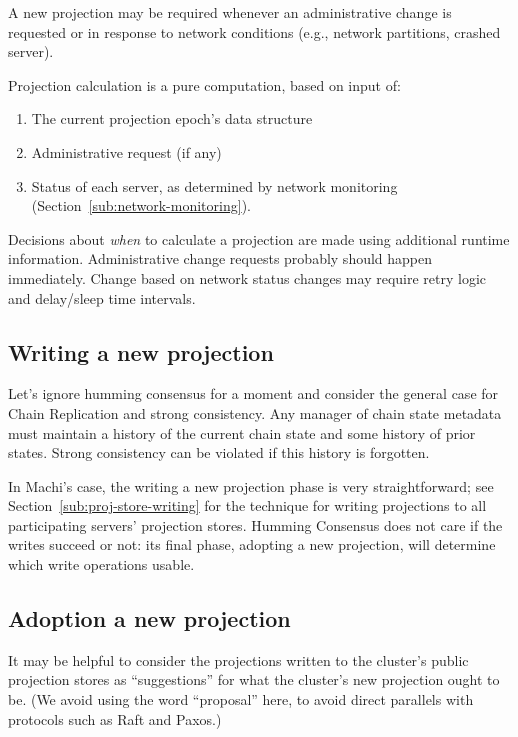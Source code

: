 \documentclass[preprint,10pt]{sigplanconf}
\begin{document}
A new projection may be
required whenever an administrative change is requested or in response
to network conditions (e.g., network partitions, crashed server).

Projection calculation is a pure computation, based on input of:

\begin{enumerate}
\item The current projection epoch's data structure
\item Administrative request (if any)
\item Status of each server, as determined by network monitoring
(Section~\ref{sub:network-monitoring}).
\end{enumerate}

Decisions about {\em when} to calculate a projection are made
using additional runtime information.  Administrative change requests
probably should happen immediately.  Change based on network status
changes may require retry logic and delay/sleep time intervals.

\subsection{Writing a new projection}
\label{sub:proj-storage-writing}

Let's ignore humming consensus for a moment and consider the general
case for Chain Replication and strong consistency.  Any manager of
chain state metadata must maintain a history of the current chain
state and some history of prior states.  Strong consistency can be
violated if this history is forgotten.

In Machi's case, the writing a new projection phase is very
straightforward; see
Section~\ref{sub:proj-store-writing} for the technique for writing
projections to all participating servers' projection stores.
Humming Consensus does not care
if the writes succeed or not: its final phase, adopting a
new projection, will determine which write operations usable.

\subsection{Adoption a new projection}
\label{sub:proj-adoption}

It may be helpful to consider the projections written to the cluster's
public projection stores as ``suggestions'' for what the cluster's new
projection ought to be.  (We avoid using the word ``proposal'' here,
to avoid direct parallels with protocols such as Raft and Paxos.)
\end{document}
